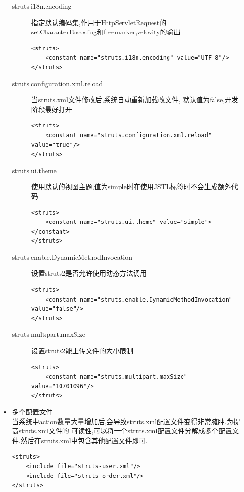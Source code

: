 \begin{itemize}
\begin{description}
\item[struts.i18n.encoding] 指定默认编码集,作用于HttpServletRequest的\\
setCharacterEncoding和freemarker,velovity的输出
\begin{lstlisting}[style=JAVA]
<struts>
	<constant name="struts.i18n.encoding" value="UTF-8"/>
</struts>    
\end{lstlisting}

\item[struts.configuration.xml.reload]	当struts.xml文件修改后,系统自动重新加载改文件,
默认值为false,开发阶段最好打开
\begin{lstlisting}[style=JAVA]
<struts>
	<constant name="struts.configuration.xml.reload" value="true"/>
</struts>    
\end{lstlisting}

\item[struts.ui.theme]	使用默认的视图主题,值为simple时在使用JSTL标签时不会生成额外代码
\begin{lstlisting}[style=JAVA]
<struts>
	<constant name="struts.ui.theme" value="simple"></constant>
</struts>    
\end{lstlisting}

\item[struts.enable.DynamicMethodInvocation]	设置struts2是否允许使用动态方法调用
\begin{lstlisting}[style=JAVA]
<struts>
	<constant name="struts.enable.DynamicMethodInvocation" value="false"/>
</struts>    
\end{lstlisting}

\item[struts.multipart.maxSize] 设置struts2能上传文件的大小限制
\begin{lstlisting}[style=JAVA]
<struts>
	<constant name="struts.multipart.maxSize" value="10701096"/>
</struts>    
\end{lstlisting}
\end{description}

\item 多个配置文件\\
当系统中action数量大量增加后,会导致struts.xml配置文件变得非常臃肿.为提高struts.xml文件的
可读性,可以将一个struts.xml配置文件分解成多个配置文件,然后在struts.xml中包含其他配置文件即可.
\begin{lstlisting}[style=JAVA]
<struts>
	<include file="struts-user.xml"/>
	<include file="struts-order.xml"/>
</struts>    
\end{lstlisting}


\end{itemize}

